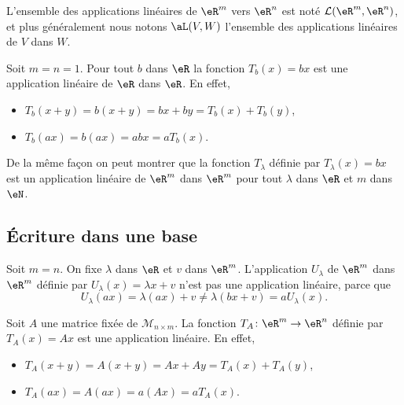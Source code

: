 L'ensemble des applications linéaires de $\eR^m$ vers $\eR^n$ est noté $\mathcal{L}(\eR^m, \eR^n)$, et plus généralement nous notons $\aL(V,W)$ l'ensemble des applications linéaires de $V$ dans $W$. 

\begin{example}
Soit $m=n=1$. Pour tout $b$ dans $\eR$ la fonction $T_b(x)= bx$ est une application linéaire de $\eR$ dans $\eR$. En effet,
\begin{itemize}
\item  $T_b(x+y)= b(x+y)= bx + by = T_b(x)+T_b(y)$,
\item $T_b(ax)=b(ax)= abx = a T_b(x)$.
\end{itemize}
De la même façon on peut montrer que la fonction $T_{\lambda}$ définie par $T_{\lambda}(x)=bx$ est un application linéaire de $\eR^m$ dans $\eR^m$ pour tout $\lambda$ dans $\eR$ et $m$ dans $\eN$.
\end{example}

\subsection{Écriture dans une base}

\begin{example}\label{ex_affine}
	Soit $m=n$. On fixe $\lambda$ dans $\eR$ et $v$ dans $\eR^m$. L'application $U_{\lambda}$ de $\eR^m$ dans $\eR^m$ définie par $U_{\lambda}(x)=\lambda x+v$ n'est pas une application linéaire, parce que 
\[
U_{\lambda}(ax)=\lambda(ax)+v\neq \lambda(bx+v)=a U_{\lambda}(x).
\]
\end{example}

\begin{example}\label{exampleT_A}
	Soit $A$ une matrice fixée de $\mathcal{M}_{n\times m}$. La fonction $T_A\colon \eR^m\to \eR^n$ définie par $T_A(x)=Ax$ est une application linéaire. En effet, 
\begin{itemize}
\item  $T_A(x+y)= A(x+y)= Ax + Ay = T_A(x)+T_A(y)$,
\item $T_A(ax)=A(ax)= a(Ax) = a T_A(x)$.
\end{itemize}
\end{example}

